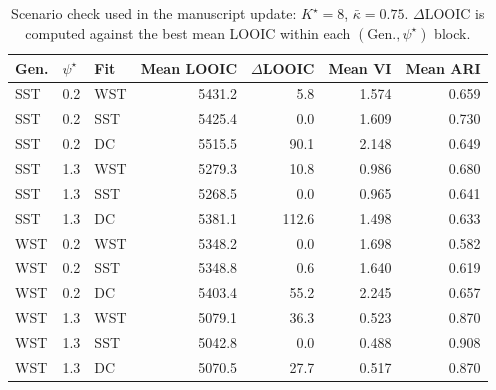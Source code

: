 \begin{table}[htbp]
\centering
\caption{Scenario check used in the manuscript update: $K^\star=8$, $\bar\kappa=0.75$. $\Delta$LOOIC is computed against the best mean LOOIC within each $(\mathrm{Gen.},\psi^\star)$ block.}
\label{tab:extended-k8-focus}
\begin{tabular}{lllrrrr}
\toprule
Gen. & $\psi^\star$ & Fit & Mean LOOIC & $\Delta$LOOIC & Mean VI & Mean ARI \\
\midrule
SST & 0.2 & WST & 5431.2 & 5.8 & 1.574 & 0.659 \\
SST & 0.2 & SST & 5425.4 & 0.0 & 1.609 & 0.730 \\
SST & 0.2 & DC & 5515.5 & 90.1 & 2.148 & 0.649 \\
SST & 1.3 & WST & 5279.3 & 10.8 & 0.986 & 0.680 \\
SST & 1.3 & SST & 5268.5 & 0.0 & 0.965 & 0.641 \\
SST & 1.3 & DC & 5381.1 & 112.6 & 1.498 & 0.633 \\
WST & 0.2 & WST & 5348.2 & 0.0 & 1.698 & 0.582 \\
WST & 0.2 & SST & 5348.8 & 0.6 & 1.640 & 0.619 \\
WST & 0.2 & DC & 5403.4 & 55.2 & 2.245 & 0.657 \\
WST & 1.3 & WST & 5079.1 & 36.3 & 0.523 & 0.870 \\
WST & 1.3 & SST & 5042.8 & 0.0 & 0.488 & 0.908 \\
WST & 1.3 & DC & 5070.5 & 27.7 & 0.517 & 0.870 \\
\bottomrule
\end{tabular}
\end{table}
